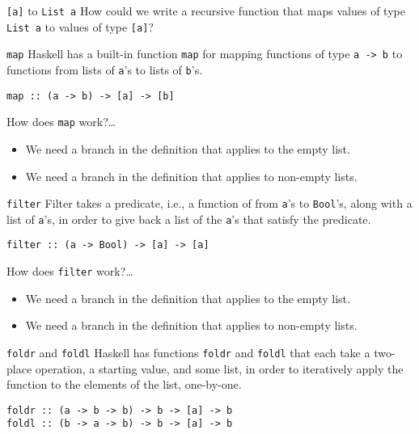 \documentclass[presentation]{beamer}
\begin{document}
\begin{frame}[label={sec:org40a047e},fragile]{\texttt{[a]} to \texttt{List a}}
 How could we write a recursive function that maps values of type \texttt{List a} to
values of type \texttt{[a]}?
\end{frame}

\begin{frame}[label={sec:org4c7cd6b},fragile]{\texttt{map}}
 Haskell has a built-in function \texttt{map} for mapping functions of type \texttt{a -> b} to
functions from lists of \texttt{a}'s to lists of \texttt{b}'s.
\begin{center}
\texttt{map :: (a -> b) -> [a] -> [b]}
\end{center}
How does \texttt{map} work?\ldots{}
\pause
\begin{itemize}[<+->]
\item We need a branch in the definition that applies to the empty list.
\item We need a branch in the definition that applies to non-empty lists.
\end{itemize}
\end{frame}

\begin{frame}[label={sec:orgb5db6ae},fragile]{\texttt{filter}}
 Filter takes a predicate, i.e., a function of from \texttt{a}'s to \texttt{Bool}'s, along with
a list of \texttt{a}'s, in order to give back a list of the \texttt{a}'s that satisfy the
predicate.
\begin{center}
\texttt{filter :: (a -> Bool) -> [a] -> [a]}
\end{center}
How does \texttt{filter} work?\ldots{}
\pause
\begin{itemize}[<+->]
\item We need a branch in the definition that applies to the empty list.
\item We need a branch in the definition that applies to non-empty lists.
\end{itemize}
\end{frame}

\begin{frame}[label={sec:orgac1012c},fragile]{\texttt{foldr} and \texttt{foldl}}
 Haskell has functions \texttt{foldr} and \texttt{foldl} that each take a two-place operation, a
starting value, and some list, in order to iteratively apply the function to
the elements of the list, one-by-one.
\begin{center}
\texttt{foldr :: (a -> b -> b) -> b -> [a] -> b} \\[0pt]
\texttt{foldl :: (b -> a -> b) -> b -> [a] -> b}
\end{center}
\end{frame}
\end{document}
